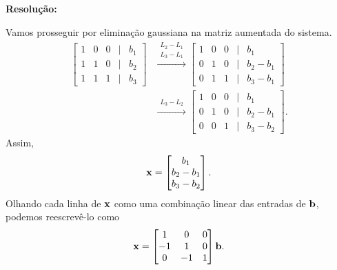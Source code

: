 \documentclass[leqno]{article}
\newenvironment{sol}
{
    \vspace{4mm}
    \noindent\textbf{Resolução:}
    \strut\newline
    \smallskip
    \hspace{-3.5mm}
}
{}
\begin{document}
\begin{enumerate}
\begin{sol} 
	 Vamos prosseguir por eliminação gaussiana na matriz aumentada do sistema.
     \begin{align*}
         \begin{bmatrix}
             1 & 0 & 0 & \mid & b_{ 1 } \\
             1 & 1 & 0 & \mid & b_{ 2 }\\
             1 & 1 & 1 & \mid & b_{ 3 }
         \end{bmatrix}
         &\xrightarrow{
             \begin{array}{l}
                 L_{ 2 } - L_{ 1 } \\
                 L_{ 3 } - L_{ 1 }
             \end{array}
         }
         \begin{bmatrix}
             1 & 0 & 0 & \mid & b_{ 1 } \\
             0 & 1 & 0 & \mid & b_{ 2 } - b_{ 1 } \\
             0 & 1 & 1 & \mid & b_{ 3 } - b_{ 1 }
         \end{bmatrix} \\
         &\xrightarrow{
             \begin{array}{l}
                 L_{ 3 } - L_{ 2 }
             \end{array}
         }
         \begin{bmatrix}
             1 & 0 & 0 & \mid & b_{ 1 } \\
             0 & 1 & 0 & \mid & b_{ 2 } - b_{ 1 } \\
             0 & 0 & 1 & \mid & b_{ 3 } - b_{ 2 }
         \end{bmatrix}
     .\end{align*}
     Assim,
     \begin{equation*}
         \mathbf{x} =
         \begin{bmatrix}
             b_{ 1 } \\
             b_{ 2 } - b_{ 1 } \\
             b_{ 3 } - b_{ 2 }
         \end{bmatrix}
     .\end{equation*}
\end{sol} 
Olhando cada linha de \( \mathbf{x} \) como uma combinação linear das entradas de \( \mathbf{b} \), podemos reescrevê-lo como
\begin{equation*}
    \mathbf{x} =
    \begin{bmatrix}
        1 & 0 & 0 \\
        -1 & 1 & 0 \\
        0 & -1 & 1
    \end{bmatrix}
    \mathbf{b}
.\end{equation*}


\end{enumerate}
\end{document}

